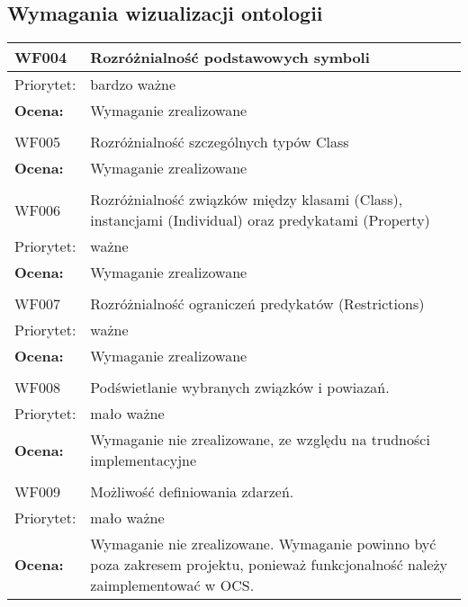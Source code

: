\documentclass[a4paper,10pt]{article}
\begin{document}
\subsection{Wymagania wizualizacji ontologii}

\begin{center}
\begin{tabular}{|m{3cm}|m{9cm}|} \hline

WF004 & Rozróżnialność podstawowych symboli  \\ \hline
Priorytet: & bardzo ważne \\ \hline
\textbf{Ocena:} & Wymaganie zrealizowane \\ \hline

\multicolumn{2}{c}{} \\
 \hline

WF005 &   Rozróżnialność szczególnych typów Class\\ \hline
\textbf{Ocena:} & Wymaganie zrealizowane \\ \hline
\multicolumn{2}{c}{} \\
 \hline

WF006 &  Rozróżnialność związków między klasami (Class), instancjami (Individual) oraz predykatami (Property)\\ \hline
Priorytet: & ważne \\ \hline
\textbf{Ocena:} & Wymaganie zrealizowane \\ \hline
\multicolumn{2}{c}{} \\
 \hline

WF007 & Rozróżnialność ograniczeń predykatów (Restrictions) \\ \hline
Priorytet: & ważne \\ \hline
\textbf{Ocena:} & Wymaganie zrealizowane \\ \hline
\multicolumn{2}{c}{} \\
 \hline

WF008 &  Podświetlanie wybranych związków i powiazań.\\ \hline
Priorytet: & mało ważne \\ \hline
\textbf{Ocena:} & Wymaganie nie zrealizowane, ze względu na trudności implementacyjne \\ \hline
\multicolumn{2}{c}{} \\
 \hline

WF009 & Możliwość definiowania zdarzeń. \\ \hline
Priorytet: & mało ważne \\ \hline
\textbf{Ocena:} & Wymaganie nie zrealizowane. Wymaganie powinno być poza zakresem projektu, ponieważ funkcjonalność należy zaimplementować w OCS. \\ \hline
\end{tabular}

\end{center}
\end{document}
